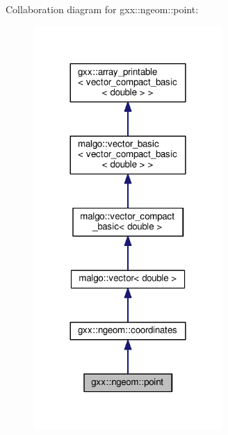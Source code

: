 Collaboration diagram for gxx\+:\+:ngeom\+:\+:point\+:
\nopagebreak
\begin{figure}[H]
\begin{center}
\leavevmode
\includegraphics[width=204pt]{classgxx_1_1ngeom_1_1point__coll__graph}
\end{center}
\end{figure}
